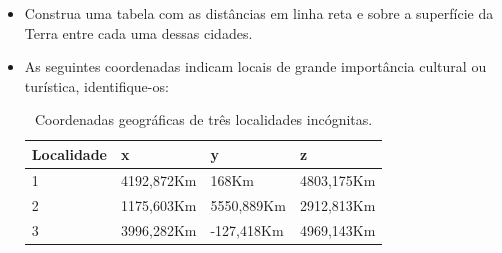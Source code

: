 \begin{exer}
\begin{itemize}
\begin{table}[h]
	\caption{Coordenadas geográficas de algumas cidades.}
	\label{tabcidades}
\end{table}
\item[e)] Construa uma tabela com as distâncias em linha reta e sobre a superfície da Terra entre cada uma dessas cidades.
\item[f)] As seguintes coordenadas indicam locais de grande importância cultural ou turística, identifique-os:
\begin{table}[htp]
	\centering
		\begin{tabular}{|l|l|l|l|}
		\hline
Localidade &	  x & y & z\\
		\hline
1&		4192,872Km & 168Km & 4803,175Km\\
		\hline
2&		1175,603Km&	5550,889Km&	2912,813Km\\
		\hline
3&   3996,282Km&	-127,418Km&	4969,143Km\\
  	\hline
		\end{tabular}
	\caption{Coordenadas geográficas de três localidades incógnitas.}
	\label{tabmonumentos}
\end{table}
\end{itemize}
\end{exer}


%





